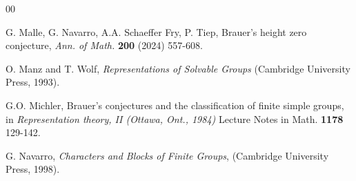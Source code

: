 \documentclass[11pt]{amsart}
\begin{document}
\begin{thebibliography}{00}




 G. Malle, G. Navarro, A.A. Schaeffer Fry, P. Tiep, Brauer's height zero conjecture, {\it Ann. of Math.} {\textbf{200}} (2024) 557-608.

 O. Manz and T. Wolf,  \textsl{Representations of Solvable Groups} (Cambridge University Press, 1993).

 G.O. Michler, Brauer's conjectures and the classification of finite simple groups, in {\it{Representation theory, II (Ottawa, Ont., 1984)}}  Lecture Notes in Math. {\bf{1178}} 129-142.



 G. Navarro, \textsl{Characters and Blocks of Finite Groups}, (Cambridge University Press, 1998).



  


 
\end{thebibliography}
\end{document}
